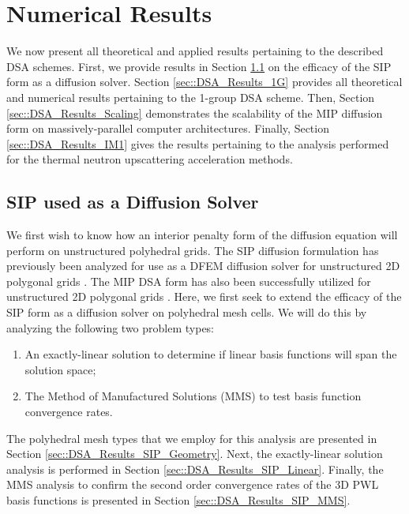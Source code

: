 \section{Numerical Results}
\label{sec::DSA_Results}

We now present all theoretical and applied results pertaining to the described DSA schemes. First, we provide results in Section \ref{sec::DSA_Results_SIP} on the efficacy of the SIP form as a diffusion solver. Section \ref{sec::DSA_Results_1G} provides all theoretical and numerical results pertaining to the 1-group DSA scheme. Then, Section \ref{sec::DSA_Results_Scaling} demonstrates the scalability of the MIP diffusion form on massively-parallel computer architectures. Finally, Section \ref{sec::DSA_Results_IM1} gives the results pertaining to the analysis performed for the thermal neutron upscattering acceleration methods.

\subsection{SIP used as a Diffusion Solver}
\label{sec::DSA_Results_SIP}

We first wish to know how an interior penalty form of the diffusion equation will perform on unstructured polyhedral grids. The SIP diffusion formulation has previously been analyzed for use as a DFEM diffusion solver for unstructured 2D polygonal grids \cite{ragusa2015discontinuous}. The MIP DSA form has also been successfully utilized for unstructured 2D polygonal grids \cite{turcksin2014discontinuous}. Here, we first seek to extend the efficacy of the SIP form as a diffusion solver on polyhedral mesh cells. We will do this by analyzing the following two problem types:

\begin{enumerate}
	\item An exactly-linear solution to determine if linear basis functions will span the solution space;
	\item The Method of Manufactured Solutions (MMS) to test basis function convergence rates.
\end{enumerate}

The polyhedral mesh types that we employ for this analysis are presented in Section \ref{sec::DSA_Results_SIP_Geometry}. Next, the exactly-linear solution analysis is performed in Section \ref{sec::DSA_Results_SIP_Linear}. Finally, the MMS analysis to confirm the second order convergence rates of the 3D PWL basis functions is presented in Section \ref{sec::DSA_Results_SIP_MMS}.

